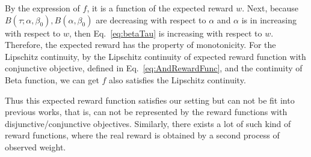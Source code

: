 \documentclass{article}
\begin{document}
By the expression of $f$, it is a function of the expected reward $w$. Next, because $B(\tau; \alpha, \beta_0), B(\alpha, \beta_0)$ are decreasing with respect to $\alpha$ and $\alpha$ is in increasing with respect to $w$, then Eq.~\eqref{eq:betaTau} is increasing with respect to $w$. Therefore, the expected reward has the property of monotonicity. For the Lipschitz continuity, by the Lipschitz continuity of expected reward function with conjunctive objective, defined in Eq.~\eqref{eq:AndRewardFunc}, and the continuity of Beta function, we can get $f$ also satisfies the Lipschitz continuity.

Thus this expected reward function satisfies our setting but can not be fit into previous works, that is, can not be represented by the reward functions with disjunctive/conjunctive objectives. Similarly, there exists a lot of such kind of reward functions, where the real reward is obtained by a second process of observed weight.




\end{document}
